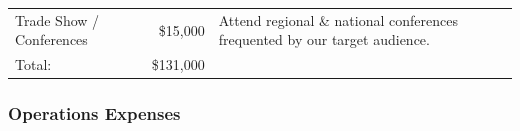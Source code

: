 \documentclass[10pt,openany]{book}
\begin{document}
\begin{longtable}[]{@{}lrl@{}}
\begin{minipage}[t]{0.32\columnwidth}\raggedright
Trade Show / Conferences\strut
\end{minipage} & \begin{minipage}[t]{0.11\columnwidth}\raggedleft
\$15,000\strut
\end{minipage} & \begin{minipage}[t]{0.48\columnwidth}\raggedright
Attend regional \& national conferences frequented by our target
audience.\strut
\end{minipage}\tabularnewline
\begin{minipage}[t]{0.32\columnwidth}\raggedright
Total:\strut
\end{minipage} & \begin{minipage}[t]{0.11\columnwidth}\raggedleft
\$131,000\strut
\end{minipage} & \begin{minipage}[t]{0.48\columnwidth}\raggedright
\strut
\end{minipage}\tabularnewline
\bottomrule
\end{longtable}

\newpage

\hypertarget{operations-expenses}{%
\subsubsection{Operations Expenses}\label{operations-expenses}}
\end{document}
